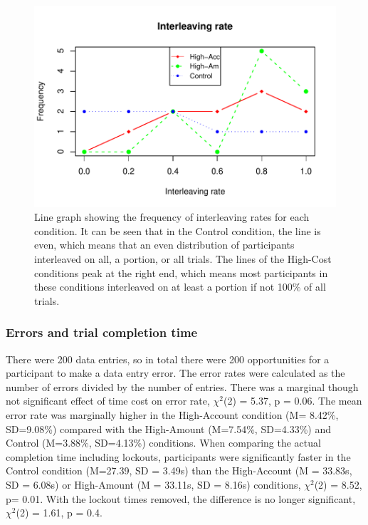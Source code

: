 \begin{figure}
 \includegraphics[width=\textwidth]{images/ch34/ch34-5_linechart.pdf}
\caption{Line graph showing the frequency of interleaving rates for each condition. It can be seen that in the Control condition, the line is even, which means that an even distribution of participants interleaved on all, a portion, or all trials. The lines of the High-Cost conditions peak at the right end, which means most participants in these conditions interleaved on at least a portion if not 100\% of all trials.}
\label{fig:ch34_5-linechart}
\end{figure}

\subsubsection{Errors and trial completion time}
There were 200 data entries, so in total there were 200 opportunities for a participant to make a data entry error. The error rates were calculated as the number of errors divided by the number of entries. 
There was a marginal though not significant effect of time cost on error rate, $\chi^2$(2) = 5.37, p = 0.06. The mean error rate was marginally higher in the High-Account condition (M= 8.42\%, SD=9.08\%) compared with the High-Amount (M=7.54\%, SD=4.33\%) and Control (M=3.88\%, SD=4.13\%) conditions. When comparing the actual completion time including lockouts, participants were significantly faster in the Control condition (M=27.39, SD = 3.49s) than the High-Account (M = 33.83s, SD = 6.08s) or High-Amount (M = 33.11s, SD = 8.16s) conditions,  $\chi^2$(2) = 8.52, p= 0.01. With the lockout times removed, the difference is no longer significant, $\chi^2$(2) = 1.61, p = 0.4.

